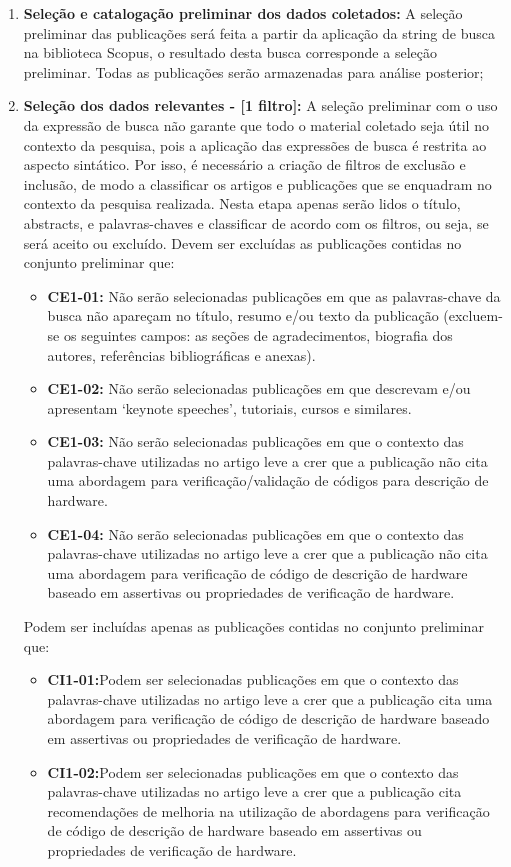 \begin{enumerate}
\item \textbf{Seleção e catalogação preliminar dos dados coletados:} A seleção preliminar das publicações será feita a partir da aplicação da string de busca na biblioteca Scopus, o resultado desta busca corresponde a seleção preliminar. Todas as publicações serão armazenadas para análise posterior;

\item \textbf{Seleção dos dados relevantes - [1 filtro]:} A seleção preliminar com o uso da expressão de busca não garante que todo o material coletado seja útil no contexto da pesquisa, pois a aplicação das expressões de busca é restrita ao aspecto sintático. Por isso, é necessário a criação de filtros de exclusão e inclusão, de modo a classificar os artigos e publicações que se enquadram no contexto da pesquisa realizada. Nesta etapa apenas serão lidos o título, abstracts, e palavras-chaves e classificar de acordo com os filtros, ou seja, se será aceito ou excluído. Devem ser excluídas as publicações contidas no conjunto preliminar que:
	\begin{itemize}
	\item \textbf{CE1-01:} Não serão selecionadas publicações em que as palavras-chave da busca não apareçam no título, resumo e/ou texto da publicação (excluem-se os seguintes campos: as seções de agradecimentos, biografia dos autores, referências bibliográficas e anexas).
	\item \textbf{CE1-02:} Não serão selecionadas publicações em que descrevam e/ou apresentam ‘keynote speeches’, tutoriais, cursos e similares.
	\item \textbf{CE1-03:} Não serão selecionadas publicações em que o contexto das palavras-chave utilizadas no artigo leve a crer que a publicação não cita uma abordagem para verificação/validação de códigos para descrição de hardware.   
	\item \textbf{CE1-04:} Não serão selecionadas publicações em que o contexto das palavras-chave utilizadas no artigo leve a crer que a publicação não cita uma abordagem para verificação de código de descrição de hardware baseado em assertivas ou propriedades de verificação de hardware.
\end{itemize}

Podem ser incluídas apenas as publicações contidas no conjunto preliminar que:

	\begin{itemize}
	\item \textbf{CI1-01:}Podem ser selecionadas publicações em que o contexto das palavras-chave utilizadas no artigo leve a crer que a publicação cita uma abordagem para verificação de código de descrição de hardware baseado em assertivas ou propriedades de verificação de hardware.
	\item \textbf{CI1-02:}Podem ser selecionadas publicações em que o contexto das palavras-chave utilizadas no artigo leve a crer que a publicação cita recomendações de melhoria na utilização de abordagens para verificação de código de descrição de hardware baseado em assertivas ou propriedades de verificação de hardware.
	\end{itemize}
	

\end{enumerate}

